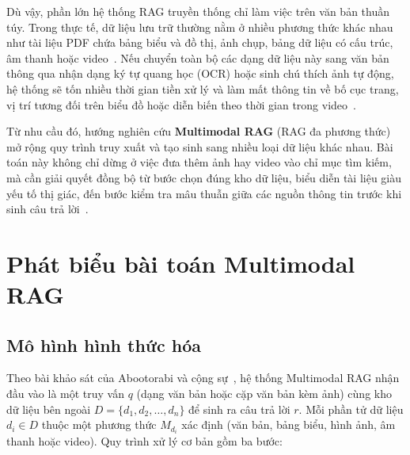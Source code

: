 Dù vậy, phần lớn hệ thống RAG truyền thống chỉ làm việc trên văn bản thuần túy. Trong thực tế, dữ liệu lưu trữ thường nằm ở nhiều phương thức khác nhau như tài liệu PDF chứa bảng biểu và đồ thị, ảnh chụp, bảng dữ liệu có cấu trúc, âm thanh hoặc video~\cite{abootorabi2025ask,yeo2026universalrag}. Nếu chuyển toàn bộ các dạng dữ liệu này sang văn bản thông qua nhận dạng ký tự quang học (OCR) hoặc sinh chú thích ảnh tự động, hệ thống sẽ tốn nhiều thời gian tiền xử lý và làm mất thông tin về bố cục trang, vị trí tương đối trên biểu đồ hoặc diễn biến theo thời gian trong video~\cite{faysse2025colpali,yu2025visrag}.

Từ nhu cầu đó, hướng nghiên cứu \textbf{Multimodal RAG} (RAG đa phương thức) mở rộng quy trình truy xuất và tạo sinh sang nhiều loại dữ liệu khác nhau. Bài toán này không chỉ dừng ở việc đưa thêm ảnh hay video vào chỉ mục tìm kiếm, mà cần giải quyết đồng bộ từ bước chọn đúng kho dữ liệu, biểu diễn tài liệu giàu yếu tố thị giác, đến bước kiểm tra mâu thuẫn giữa các nguồn thông tin trước khi sinh câu trả lời~\cite{abootorabi2025ask,yeo2026universalrag,tian2025coremmrag}.

\section{Phát biểu bài toán Multimodal RAG}
\label{sec:intro_problem}

\subsection{Mô hình hình thức hóa}

Theo bài khảo sát của Abootorabi và cộng sự~\cite{abootorabi2025ask}, hệ thống Multimodal RAG nhận đầu vào là một truy vấn $q$ (dạng văn bản hoặc cặp văn bản kèm ảnh) cùng kho dữ liệu bên ngoài $D = \{d_1, d_2, \dots, d_n\}$ để sinh ra câu trả lời $r$. Mỗi phần tử dữ liệu $d_i \in D$ thuộc một phương thức $M_{d_i}$ xác định (văn bản, bảng biểu, hình ảnh, âm thanh hoặc video). Quy trình xử lý cơ bản gồm ba bước:

